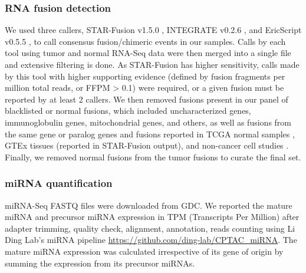 \subsubsection{RNA fusion detection}
We used three callers, STAR-Fusion v1.5.0 \cite{haasbj_regeva:AccuracyAssessment2019}, INTEGRATE v0.2.6 \cite{zhangj_maherca:INTEGRATEGene2016}, and EricScript v0.5.5 \cite{benellim_magia:DiscoveringChimeric2012}, to call consensus fusion/chimeric events in our samples. Calls by each tool using tumor and normal RNA-Seq data were then merged into a single file and extensive filtering is done. As STAR-Fusion has higher sensitivity, calls made by this tool with higher supporting evidence (defined by fusion fragments per million total reads, or FFPM > 0.1) were required, or a given fusion must be reported by at least 2 callers. We then removed fusions present in our panel of blacklisted or normal fusions, which included uncharacterized genes, immunoglobulin genes, mitochondrial genes, and others, as well as fusions from the same gene or paralog genes and fusions reported in TCGA normal samples \cite{gaoq_dingl:DriverFusions2018}, GTEx tissues (reported in STAR-Fusion output), and non-cancer cell studies \cite{babiceanum_lih:RecurrentChimeric2016}. Finally, we removed normal fusions from the tumor fusions to curate the final set.

\subsubsection{miRNA quantification}
miRNA-Seq FASTQ files were downloaded from GDC. We reported the mature miRNA and precursor miRNA expression in TPM (Transcripts Per Million) after adapter trimming, quality check, alignment, annotation, reads counting using Li Ding Lab’s miRNA pipeline \url{https://github.com/ding-lab/CPTAC_miRNA}. The mature miRNA expression was calculated irrespective of its gene of origin by summing the expression from its precursor miRNAs.

